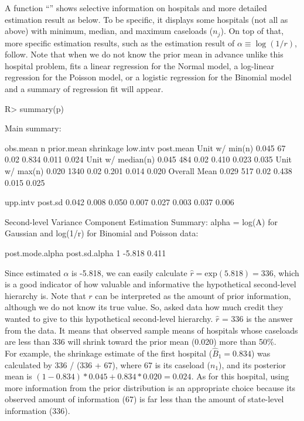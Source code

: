 \documentclass[article]{jss}
\begin{document}
A function ``'' shows selective information on hospitals and more detailed estimation result as below. To be specific, it displays some hospitals (not all as above) with minimum, median, and maximum caseloads ($n_{j}$). On top of that, more specific estimation results, such as the estimation result of $\alpha\equiv\log(1/r)$, follow. Note that when we do not know the prior mean in advance unlike this hospital problem,  fits a linear regression for the Normal model, a log-linear regression for the Poisson model, or a logistic regression for the Binomial model and a summary of regression fit will appear.
\begin{CodeChunk}
\begin{CodeInput}
R> summary(p)
\end{CodeInput}
\begin{CodeOutput}
Main summary:

                  obs.mean    n prior.mean shrinkage low.intv post.mean
Unit w/ min(n)       0.045   67       0.02     0.834    0.011     0.024
Unit w/ median(n)    0.045  484       0.02     0.410    0.023     0.035
Unit w/ max(n)       0.020 1340       0.02     0.201    0.014     0.020
Overall Mean         0.029  517       0.02     0.438    0.015     0.025

                  upp.intv post.sd
                     0.042   0.008
                     0.050   0.007
                     0.027   0.003
                     0.037   0.006

Second-level Variance Component Estimation Summary:
alpha = log(A) for Gaussian and log(1/r) for Binomial and Poisson data:

  post.mode.alpha post.sd.alpha
1          -5.818         0.411
\end{CodeOutput}
\end{CodeChunk}
Since estimated $\alpha$ is -5.818, we can easily calculate $\hat{r}=\textrm{exp}(5.818)=336$, which is a good indicator of how valuable and informative the hypothetical second-level hierarchy is. Note that $r$ can be interpreted as the amount of prior information, although we do not know its true value. So,  asked data how much credit they wanted to give to this hypothetical second-level hierarchy. $\hat{r}$ = 336 is the answer from the data. It means that observed sample means of hospitals whose caseloads are less than 336 will shrink toward the prior mean (0.020) more than 50\%. 
\\

For example, the shrinkage estimate of the first hospital ($\hat{B}_{1}= 0.834$) was calculated by 336 / (336 + 67), where 67 is its caseload ($n_{1}$), and its posterior mean is $(1-0.834)*0.045 + 0.834 * 0.020=0.024$. As for this hospital, using more information from the prior distribution is an appropriate choice because its observed amount of information (67) is far less than the amount of state-level information (336).
\\
\end{document}
